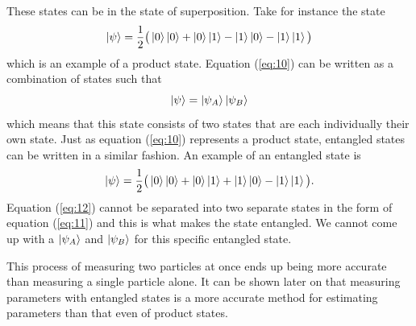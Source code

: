 \documentclass[twocolumn]{article}
\begin{document}
These states can be in the state of superposition. Take for instance the state
\begin{equation}\label{eq:10}
\ket{\psi}=\frac{1}{2}\big(\ket{0}\ket{0}+\ket{0}\ket{1}-\ket{1}\ket{0}-\ket{1}\ket{1}\big)
\end{equation}
which is an example of a product state. Equation (\ref{eq:10}) can be written as a combination of states such that
\begin{equation}\label{eq:11}
\ket{\psi}=\ket{\psi_A}\ket{\psi_B}
\end{equation}
which means that this state consists of two states that are each individually their own state. Just as equation (\ref{eq:10}) represents a product state, entangled states can be written in a similar fashion. An example of an entangled state is
\begin{equation}\label{eq:12}
\ket{\psi}=\frac{1}{2}\big(\ket{0}\ket{0}+\ket{0}\ket{1}+\ket{1}\ket{0}-\ket{1}\ket{1}\big).
\end{equation}
Equation (\ref{eq:12}) cannot be separated into two separate states in the form of equation (\ref{eq:11}) and this is what makes the state entangled. We cannot come up with a $\ket{\psi_A}$ and $\ket{\psi_B}$ for this specific entangled state.

This process of measuring two particles at once ends up being more accurate than measuring a single particle alone. It can be shown later on that measuring parameters with entangled states is a more accurate method for estimating parameters than that even of product states.
\end{document}
